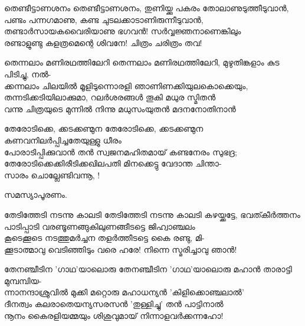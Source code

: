 \begin{enumerate}
\begin{slokam}{\VSv}{\VenM}{തെണ്ടീട്ടാണശനം}
തെണ്ടീട്ടാണശനം, തുണിയ്ക്കു പകരം തോലാണുടുത്തീടുവാൻ,\\
പണ്ടം പന്നഗമാണു, കണ്ട ചുടലക്കാടാണിരുന്നീടുവാൻ,\\
തണ്ടാർസായകവൈരിയാണു ഭഗവൻ! സർവ്വജ്ഞനാണെങ്കിലും\\
രണ്ടാളുണ്ടു കളത്രമെന്റെ ശിവനേ! ചിത്രം ചരിത്രം തവ!
\end{slokam}
 

\begin{slokam}{\VKm}{\NV}{തെന്നലാം മണിരഥത്തിലേറി}
തെന്നലാം മണിരഥത്തിലേറി, മുഴുതിങ്കളാം കുട പിടിച്ചു, നൽ-\\
ക്കന്നലാം ചിലയിൽ മൂളിടുന്നൊരളി ഞാണിണക്കിയുലകൊക്കെയും,\\
തന്നടിക്കടിയിലാക്കുമാ, റലർശരങ്ങൾ തൂകി മധുര സ്മിതൻ\\
വന്നു ചിത്രയുടെ മുന്നിൽ നിന്നു മധുസംയുതൻ മദനനോതിനാൻ
\end{slokam}


\begin{slokam}{\VSr}{\VKG}{തേരോടിക്കെ, ക്കടക്കണ്മുന}
തേരോടിക്കെ, ക്കടക്കണ്മുന കണവനിലർപ്പിച്ചതേയുള്ളു ധീരം\\
പോരാടിപ്പിക്കുവാൻ തൻ സ്വജനമഹിതമായ്‌ കണ്ടനേരം സുഭദ്ര;\\
തേരോടിക്കെക്കിരീടിക്കഖിലപതി മിനക്കെട്ടു വേദാന്ത ചിന്താ-\\
സാരം ചൊല്ലേണ്ടിവന്നൂ, !
\end{slokam}



സമസ്യാപൂരണം. 



\begin{slokam}{\VSv}{\VKG}{തേടിത്തേടി നടന്നു കാലടി}
 തേടിത്തേടി നടന്നു കാലടി കഴയ്ക്കട്ടേ, ഭവത്കീർത്തനം\\
പാടിപ്പാടി വരണ്ടൂണങ്ങുകിലുണങ്ങീടട്ടെ ജിഹ്വാഞ്ചലം\\
കൂടെക്കൂടെ നടത്തുമർച്ചന തളർത്തീടട്ടെ കൈ രണ്ടു, മി-\\
ക്കൂടാത്മാവു വെടിഞ്ഞിടും വരെ ഹരേ! നിന്നെ സ്മരിച്ചാവു ഞാൻ!

\end{slokam}


\begin{slokam}{\VSv}{\KA}{തേനഞ്ചീടിന 'ഗാഥ'യാലൊരു}
 തേനഞ്ചീടിന 'ഗാഥ'യാലൊരു മഹാൻ താരാട്ടി മുമ്പമ്പിയ-\\
ന്നാനന്ദാശ്രുവിൽ മുക്കി മറ്റൊരു മഹാധന്യൻ 'കിളിക്കൊഞ്ചലാൽ'\\
ദീനത്വം കലരാതെയന്യസരസൻ 'തുള്ളിച്ചു' തൻ പാട്ടിനാൽ\\
നൂനം കൈരളിയമ്മയും ശിശുവുമായ്‌ നിന്നാളവർക്കന്നഹോ!


\end{slokam}
\end{enumerate}
